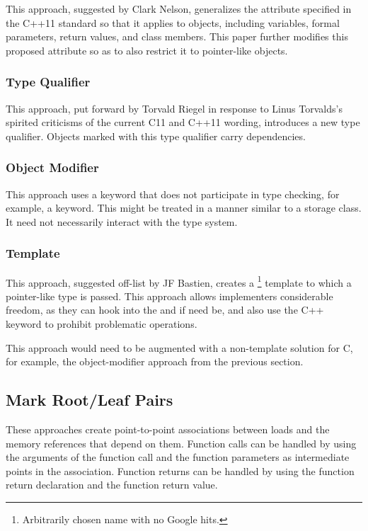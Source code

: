 \documentclass[letterpaper,twocolumn,10pt]{article}
\begin{document}
This approach, suggested by Clark Nelson, generalizes the
 attribute specified in the C++11 standard
so that it applies to objects, including variables, formal parameters,
return values, and class members.
This paper further modifies this proposed attribute so as to also restrict
it to pointer-like objects.

\subsubsection{Type Qualifier}
\label{sec:Type Qualifier}

This approach, put forward by Torvald Riegel in response to
Linus Torvalds's spirited criticisms of the current C11 and C++11
wording, introduces a new  type qualifier.
Objects marked with this type qualifier carry dependencies.

\subsubsection{Object Modifier}
\label{sec:Object Modifier}

This approach uses a keyword that does not participate in type checking,
for example, a  keyword.
This might be treated in a manner similar to a storage class.
It need not necessarily interact with the type system.

\subsubsection{Template}
\label{sec:Template}

This approach, suggested off-list by JF Bastien, creates a
\footnote{
	Arbitrarily chosen name with no Google hits.}
template to which a pointer-like type is passed.
This approach allows implementers considerable freedom, as they can
hook into the \co{->} and \co{*} if need be, and also use the C++
 keyword to prohibit problematic operations.

This approach would need to be augmented with a non-template solution
for C, for example, the object-modifier approach from
the previous section.

\subsection{Mark Root/Leaf Pairs}
\label{sec:Mark Root/Leaf Pairs}

These approaches create point-to-point associations between
 loads and the memory references that depend
on them.
Function calls can be handled by using the arguments of the function
call and the function parameters as intermediate points in the
association.
Function returns can be handled by using the function return
declaration and the function return value.
\end{document}
